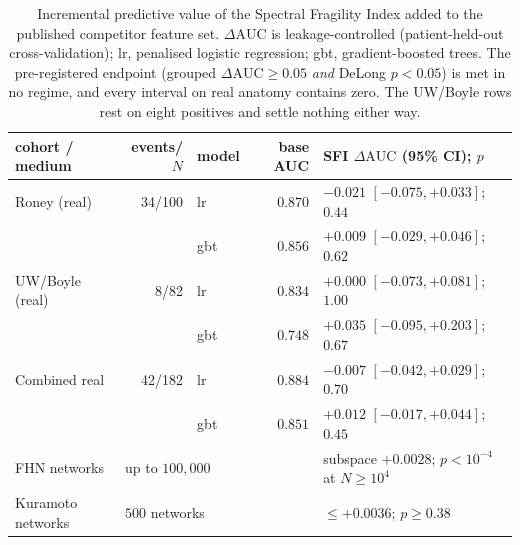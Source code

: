 \documentclass[11pt]{article}
\newcommand{\dAUC}{\ensuremath{\Delta\mathrm{AUC}}}
\begin{document}
\newpage

\begin{table}[H]
\centering
\caption{Incremental predictive value of the Spectral Fragility Index added to
the published competitor feature set. $\dAUC$ is leakage-controlled
(patient-held-out cross-validation); lr, penalised logistic regression; gbt,
gradient-boosted trees. The pre-registered endpoint (grouped $\dAUC\geq0.05$
\emph{and} DeLong $p<0.05$) is met in no regime, and every interval on real
anatomy contains zero. The UW/Boyle rows rest on eight positives and settle
nothing either way.}
\label{tab:primary}
\footnotesize
\begin{tabularx}{\linewidth}{@{}l r l r X@{}}
\toprule
cohort / medium & events/$N$ & model & base AUC & SFI $\dAUC$ (95\% CI); $p$ \\
\midrule
Roney (real)      & 34/100 & lr  & $0.870$ & $-0.021$ $[-0.075,+0.033]$; $0.44$ \\
                  &        & gbt & $0.856$ & $+0.009$ $[-0.029,+0.046]$; $0.62$ \\
UW/Boyle (real)   & 8/82   & lr  & $0.834$ & $+0.000$ $[-0.073,+0.081]$; $1.00$ \\
                  &        & gbt & $0.748$ & $+0.035$ $[-0.095,+0.203]$; $0.67$ \\
Combined real     & 42/182 & lr  & $0.884$ & $-0.007$ $[-0.042,+0.029]$; $0.70$ \\
                  &        & gbt & $0.851$ & $+0.012$ $[-0.017,+0.044]$; $0.45$ \\
\midrule
FHN networks      & \multicolumn{3}{l}{up to $100{,}000$}  & subspace $+0.0028$;
$p<10^{-4}$ at $N\geq10^4$ \\
Kuramoto networks & \multicolumn{3}{l}{$500$ networks}     & $\leq +0.0036$;
$p\geq0.38$ \\
\bottomrule
\end{tabularx}
\end{table}
\end{document}
